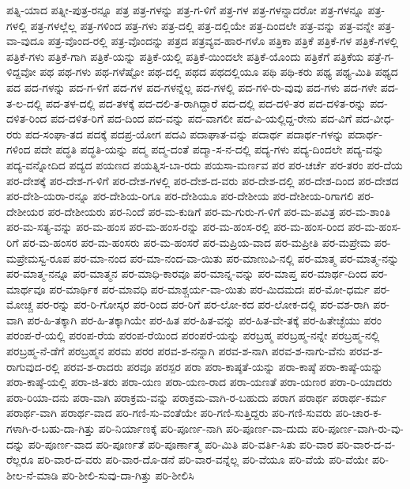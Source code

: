 {ಪತ್ನಿ-ಯಾದ
ಪತ್ನೀ-ಪುತ್ರ-ರನ್ನೂ
ಪತ್ರ
ಪತ್ರ-ಗಳನ್ನು
ಪತ್ರ-ಗ-ಳಿಗೆ
ಪತ್ರ-ಗಳ
ಪತ್ರ-ಗಳನ್ನಾದರೋ
ಪತ್ರ-ಗಳನ್ನೂ
ಪತ್ರ-ಗಳಲ್ಲಿ
ಪತ್ರ-ಗಳಲ್ಲೆಲ್ಲ
ಪತ್ರ-ಗಳಿಂದ
ಪತ್ರ-ಗಳು
ಪತ್ರ-ದಲ್ಲಿ
ಪತ್ರ-ದಲ್ಲಿಯೇ
ಪತ್ರ-ದಿಂದಲೇ
ಪತ್ರ-ವನ್ನು
ಪತ್ರ-ವನ್ನೇ
ಪತ್ರ-ವಾ-ವುದೂ
ಪತ್ರ-ವೊಂದ-ರಲ್ಲಿ
ಪತ್ರ-ವೊಂದನ್ನು
ಪತ್ರದ
ಪತ್ರವ್ಯವ-ಹಾರ-ಗಳೊ
ಪತ್ರಿಕಾ
ಪತ್ರಿಕೆ
ಪತ್ರಿಕೆ-ಗಳ
ಪತ್ರಿಕೆ-ಗಳಲ್ಲಿ
ಪತ್ರಿಕೆ-ಗಳು
ಪತ್ರಿಕೆ-ಗಾಗಿ
ಪತ್ರಿಕೆ-ಯನ್ನು
ಪತ್ರಿಕೆ-ಯಲ್ಲಿ
ಪತ್ರಿಕೆ-ಯಿಂದಲೇ
ಪತ್ರಿಕೆ-ಯೊಂದು
ಪತ್ರಿಕೆಗೆ
ಪತ್ರಿಕೆಯ
ಪತ್ರೆ-ಗ-ಳಿದ್ದವೋ
ಪಥ
ಪಥ-ಗಳು
ಪಥ-ಗಳೆಷ್ಟೋ
ಪಥ-ದಲ್ಲಿ
ಪಥದ
ಪಥದಲ್ಲಿಯೂ
ಪಥಿ
ಪಥಿ-ಕರು
ಪಥ್ಯ
ಪಥ್ಯ-ಮಿತಿ
ಪಥ್ಯದ
ಪದ
ಪದ-ಗಳನ್ನು
ಪದ-ಗ-ಳಿಗೆ
ಪದ-ಗಳ
ಪದ-ಗಳನ್ನೆಲ್ಲ
ಪದ-ಗಳಲ್ಲಿ
ಪದ-ಗಳಿ-ರು-ವುವು
ಪದ-ಗಳು
ಪದ-ಗಳೇ
ಪದ-ತ-ಲ-ದಲ್ಲಿ
ಪದ-ತಳ-ದಲ್ಲಿ
ಪದ-ತಳಕ್ಕೆ
ಪದ-ದಲಿ-ತ-ರಾಗಿದ್ದಾರೆ
ಪದ-ದಲ್ಲಿ
ಪದ-ದಳಿ-ತರ
ಪದ-ದಳಿತ-ರನ್ನು
ಪದ-ದಳಿತ-ರಿಂದ
ಪದ-ದಳಿತ-ರಿಗೆ
ಪದ-ದಿಂದ
ಪದ-ವನ್ನು
ಪದ-ವಾಗಲೀ
ಪದ-ವಿ-ಯಲ್ಲಿದ್ದ-ರೇನು
ಪದ-ವಿಗೆ
ಪದ-ವೀಧ-ರರು
ಪದ-ಸಂಘಾ-ತದ
ಪದಕ್ಕೆ
ಪದಪ್ರ-ಯೋಗ
ಪದವಿ
ಪದಾಘಾತ-ವನ್ನು
ಪದಾರ್ಥ
ಪದಾರ್ಥ-ಗಳನ್ನು
ಪದಾರ್ಥ-ಗಳಿಂದ
ಪದೇ
ಪದ್ಧತಿ
ಪದ್ಧತಿ-ಯನ್ನು
ಪದ್ಮ
ಪದ್ಮ-ದಂತೆ
ಪದ್ಮಾ-ಸ-ನ-ದಲ್ಲಿ
ಪದ್ಯ-ಗಳು
ಪದ್ಯ-ದಿಂದಲೇ
ಪದ್ಯ-ವನ್ನು
ಪದ್ಯ-ವನ್ನೋದಿದ
ಪದ್ಯದ
ಪಯಣದ
ಪಯತ್ನಿಸ-ಬಾ-ರದು
ಪಯಸಾ-ಮರ್ಣವ
ಪರ
ಪರ-ಚರ್ಚೆ
ಪರ-ತರಂ
ಪರ-ದೆಯ
ಪರ-ದೇಶಕ್ಕೆ
ಪರ-ದೇಶ-ಗ-ಳಿಗೆ
ಪರ-ದೇಶ-ಗಳಲ್ಲಿ
ಪರ-ದೇಶ-ದ-ವರು
ಪರ-ದೇಶ-ದಲ್ಲಿ
ಪರ-ದೇಶ-ದಿಂದ
ಪರ-ದೇಶದ
ಪರ-ದೇಶಿ-ಯರಾ-ರನ್ನೂ
ಪರ-ದೇಶಿಯ-ರಿಗೂ
ಪರ-ದೇಶಿಯೂ
ಪರ-ದೇಶೀಯ
ಪರ-ದೇಶೀಯ-ರಿಗಾಗಲಿ
ಪರ-ದೇಶೀಯರ
ಪರ-ದೇಶೀಯರು
ಪರ-ನಿಂದೆ
ಪರ-ಮ-ಕುಡಿಗೆ
ಪರ-ಮ-ಗುರು-ಗ-ಳಿಗೆ
ಪರ-ಮ-ಪವಿತ್ರ
ಪರ-ಮ-ಶಾಂತಿ
ಪರ-ಮ-ಸತ್ಯ-ವನ್ನು
ಪರ-ಮ-ಹಂಸ
ಪರ-ಮ-ಹಂಸ-ರನ್ನು
ಪರ-ಮ-ಹಂಸ-ರಲ್ಲಿ
ಪರ-ಮ-ಹಂಸ-ರಿಂದ
ಪರ-ಮ-ಹಂಸ-ರಿಗೆ
ಪರ-ಮ-ಹಂಸರ
ಪರ-ಮ-ಹಂಸರು
ಪರ-ಮ-ಹಂಸರೆ
ಪರ-ಮಪ್ರಿಯ-ವಾದ
ಪರ-ಮಪ್ರೀತಿ
ಪರ-ಮಪ್ರೇಮ
ಪರ-ಮಪ್ರೇಮಸ್ವ-ರೂಪ
ಪರ-ಮಾ-ನಂದ
ಪರ-ಮಾ-ನಂದ-ವಾ-ಯಿತು
ಪರ-ಮಾಣುವಿ-ನಲ್ಲಿ
ಪರ-ಮಾತ್ಮ
ಪರ-ಮಾತ್ಮ-ನನ್ನು
ಪರ-ಮಾತ್ಮ-ನನ್ನೂ
ಪರ-ಮಾತ್ಮನ
ಪರ-ಮಾಧಿ-ಕಾರವೂ
ಪರ-ಮಾನ್ನ-ವನ್ನು
ಪರ-ಮಾಪ್ತ
ಪರ-ಮಾರ್ಥ-ದಿಂದ
ಪರ-ಮಾರ್ಥವೂ
ಪರ-ಮಾರ್ಥಿಕ
ಪರ-ಮಾವಧಿ
ಪರ-ಮಾಶ್ಚರ್ಯ-ವಾ-ಯಿತು
ಪರ-ಮಿದಮದಃ
ಪರ-ಮೋ-ಧರ್ಮ
ಪರ-ಮೋಚ್ಚ
ಪರ-ರನ್ನು
ಪರ-ರಿ-ಗೋಸ್ಕರ
ಪರ-ರಿಂದ
ಪರ-ರಿಗೆ
ಪರ-ಲೋ-ಕದ
ಪರ-ಲೋಕ-ದಲ್ಲಿ
ಪರ-ವಶ-ರಾಗಿ
ಪರ-ವಾಗಿ
ಪರ-ಹಿ-ತಕ್ಕಾಗಿ
ಪರ-ಹಿ-ತಕ್ಕಾಗಿಯೇ
ಪರ-ಹಿತ
ಪರ-ಹಿತ-ವನ್ನು
ಪರ-ಹಿತ-ವೇ-ತಕ್ಕೆ
ಪರ-ಹಿತೇಚ್ಛೆಯು
ಪರಂ
ಪರಂಪ-ರೆ-ಯಲ್ಲಿ
ಪರಂಪ-ರೆಯ
ಪರಂಪ-ರೆಯಿಂದ
ಪರಂಪರೆ-ಯನ್ನು
ಪರಬ್ರಹ್ಮ
ಪರಬ್ರಹ್ಮ-ನನ್ನೇ
ಪರಬ್ರಹ್ಮ-ನಲ್ಲಿ
ಪರಬ್ರಹ್ಮ-ನೆ-ಡೆಗೆ
ಪರಬ್ರಹ್ಮನ
ಪರಮ
ಪರರ
ಪರವ-ಶ-ನನ್ನಾಗಿ
ಪರವ-ಶ-ನಾಗಿ
ಪರವ-ಶ-ನಾಗು-ವೆನು
ಪರವ-ಶ-ರಾಗುವುದ-ರಲ್ಲಿ
ಪರವ-ಶ-ರಾದರು
ಪರವೂ
ಪರಸ್ಪರ
ಪರಾ
ಪರಾ-ಕಾಷ್ಠತೆ-ಯನ್ನು
ಪರಾ-ಕಾಷ್ಠೆ
ಪರಾ-ಕಾಷ್ಠೆ-ಯನ್ನು
ಪರಾ-ಕಾಷ್ಠೆ-ಯಲ್ಲಿ
ಪರಾ-ಜಿ-ತರು
ಪರಾ-ಯಣ
ಪರಾ-ಯಣ-ರಾದ
ಪರಾ-ಯಣತೆ
ಪರಾ-ಯಣರ
ಪರಾ-ರಿ-ಯಾದರು
ಪರಾ-ರಿಯಾ-ದನು
ಪರಾ-ವಾಗಿ
ಪರಾಕ್ರಮ-ವನ್ನು
ಪರಾಕ್ರಮ-ವಾಗಿ-ರ-ಬಹುದು
ಪರಾಗ
ಪರಾರ್ಥ
ಪರಾರ್ಥ-ಕರ್ಮ
ಪರಾರ್ಥ-ವಾಗಿ
ಪರಾರ್ಥ-ವಾದ
ಪರಿ-ಗಣಿ-ಸು-ವಂತೆಯೇ
ಪರಿ-ಗಣಿ-ಸುತ್ತಿದ್ದರು
ಪರಿ-ಗಣಿ-ಸುವರು
ಪರಿ-ಚಾರ-ಕ-ಗಳಾಗಿ-ರ-ಬಹು-ದಾ-ಗಿತ್ತು
ಪರಿ-ನಿರ್ಯಾಣಕ್ಕೆ
ಪರಿ-ಪೂರ್ಣ-ನಾಗಿ
ಪರಿ-ಪೂರ್ಣ-ವಾ-ದುದು
ಪರಿ-ಪೂರ್ಣ-ವಾಗಿ-ರು-ವು-ದನ್ನು
ಪರಿ-ಪೂರ್ಣ-ವಾದ
ಪರಿ-ಪೂರ್ಣತೆ
ಪರಿ-ಪೂರ್ಣಾತ್ಮ
ಪರಿ-ಮಿತಿ
ಪರಿ-ವರ್ತಿ-ಸಿತು
ಪರಿ-ವಾರ
ಪರಿ-ವಾರ-ದ-ವ-ರೆಲ್ಲರೂ
ಪರಿ-ವಾರ-ದ-ವರು
ಪರಿ-ವಾರ-ದೊ-ಡನೆ
ಪರಿ-ವಾರ-ವನ್ನೆಲ್ಲ
ಪರಿ-ವೆಯೂ
ಪರಿ-ವೆಯೆ
ಪರಿ-ವೆಯೇ
ಪರಿ-ಶೀಲ-ನೆ-ಮಾಡಿ
ಪರಿ-ಶೀಲಿ-ಸುವು-ದಾ-ಗಿತ್ತು
ಪರಿ-ಶೀಲಿಸಿ
}
